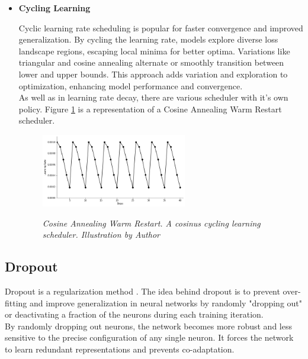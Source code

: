 \begin{itemize}
    \newpage

  \item \textbf{Cycling Learning}

    Cyclic learning rate scheduling is popular for faster convergence and
    improved generalization. By cycling the learning rate, models explore
    diverse loss landscape regions, escaping local minima for better optima.
    Variations like triangular and cosine annealing alternate or smoothly
    transition between lower and upper bounds. This approach adds variation
    and exploration to optimization, enhancing model performance and
    convergence. \\

    As well as in learning rate decay, there are various scheduler with it's
    own policy. Figure \ref{fig:cycling-rate-decay} is a
    representation of a Cosine Annealing Warm Restart scheduler.
    \begin{figure}[H] \centering
      \includegraphics[width=0.6\textwidth]{imatges/preliminaries/CosineAnnealingWarmRestarts-scheduler.png}
      \caption[Cosine Annealing Warm Restart]{\textit{Cosine Annealing Warm
      Restart. A cosinus cycling learning scheduler. Illustration by Author}}
    {\label{fig:cycling-rate-decay}} \end{figure} \end{itemize}

\newpage

\subsection{Dropout}

Dropout is a regularization method \cite{DropoutPaper}. The idea behind dropout
is to prevent over-fitting and improve generalization in neural networks by
randomly "dropping out" or deactivating a fraction of the neurons during
each training iteration. \\

By randomly dropping out neurons, the network becomes more robust and less
sensitive to the precise configuration of any single neuron. It forces the
network to learn redundant representations and prevents co-adaptation.

